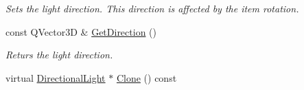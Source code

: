 \begin{DoxyCompactItemize}
\begin{DoxyCompactList}\small\item\em Sets the light direction. This direction is affected by the item rotation. \end{DoxyCompactList}\item 
\mbox{\label{class_geometry_engine_1_1_geometry_world_item_1_1_geometry_light_1_1_directional_light_a4e5ea81192c5ddab2da4b58b6209b61a}} 
const Q\+Vector3D \& \mbox{\hyperlink{class_geometry_engine_1_1_geometry_world_item_1_1_geometry_light_1_1_directional_light_a4e5ea81192c5ddab2da4b58b6209b61a}{Get\+Direction}} ()
\begin{DoxyCompactList}\small\item\em Returs the light direction. \end{DoxyCompactList}\item 
virtual \mbox{\hyperlink{class_geometry_engine_1_1_geometry_world_item_1_1_geometry_light_1_1_directional_light}{Directional\+Light}} $\ast$ \mbox{\hyperlink{class_geometry_engine_1_1_geometry_world_item_1_1_geometry_light_1_1_directional_light_a032fe23fba3bd8d0fd35f9d4ac6a9de0}{Clone}} () const
\end{DoxyCompactItemize}
